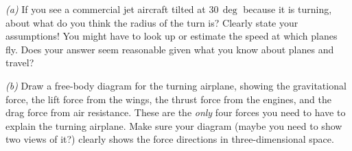 \documentclass[12pt]{article}
\begin{document}
\textsl{(a)} If you see a commercial jet aircraft tilted at $30\,\deg$
because it is turning, about what do you think the radius of the turn
is? Clearly state your assumptions! You might have to look up or
estimate the speed at which planes fly. Does your answer seem
reasonable given what you know about planes and travel?

\textsl{(b)} Draw a free-body diagram for the turning airplane,
showing the gravitational force, the lift force from the wings, the
thrust force from the engines, and the drag force from air resistance.
These are the \emph{only} four forces you need to have to explain the
turning airplane. Make sure your diagram (maybe you need to show two
views of it?) clearly shows the force directions in three-dimensional
space.
\end{document}
